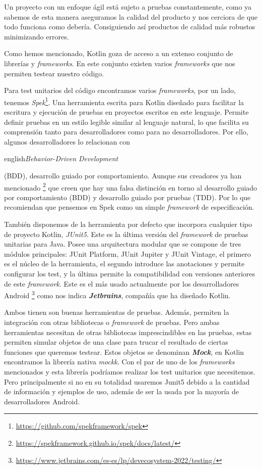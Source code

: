 Un proyecto con un enfoque ágil está sujeto a pruebas constantemente, como ya sabemos de esta manera aseguramos la calidad del producto y nos cerciora de que todo funciona como debería. Consiguiendo así productos de calidad más robustos minimizando errores.

Como hemos mencionado, Kotlin goza de acceso a un extenso conjunto de librerías y \textit{frameworks}. En este conjunto existen varios \textit{frameworks} que nos permiten testear nuestro código.

Para test unitarios del código encontramos varios \textit{frameworks}, por un lado, tenemos \textit{Spek}\footnote{\url{https://github.com/spekframework/spek}}. Una herramienta escrita para Kotlin diseñado para facilitar la escritura y ejecución de pruebas en proyectos escritos en este lenguaje. Permite definir pruebas en un estilo legible similar al lenguaje natural, lo que facilita su comprensión tanto para desarrolladores como para no desarrolladores. Por ello, algunos desarrolladores lo relacionan con \begin{otherlanguage}
{english}\textit{Behavior-Driven Development}\end{otherlanguage} (BDD), desarrollo guiado por comportamiento. Aunque sus creadores ya han mencionado \footnote{\url{https://spekframework.github.io/spek/docs/latest/}} que creen que hay una falsa distinción en torno al desarrollo guiado por comportamiento (BDD) y desarrollo guiado por pruebas (TDD). Por lo que recomiendan que pensemos en Spek como un simple \textit{framework} de especificación.

También disponemos de la herramienta por defecto que incorpora cualquier tipo de proyecto Kotlin, \textit{JUnit5}. Este es la última versión del \textit{framework} de pruebas unitarias para Java. Posee una arquitectura modular que se compone de tres módulos principales: JUnit Platform, JUnit Jupiter y JUnit Vintage, el primero es el núcleo de la herramienta, el segundo introduce las anotaciones y permite configurar los test, y la última permite la compatibilidad con versiones anteriores de este \textit{framework}. Este es el más usado actualmente por los desarrolladores Android \footnote{\url{https://www.jetbrains.com/es-es/lp/devecosystem-2022/testing/}} como nos indica \textbf{\textit{Jetbrains}}, compañía que ha diseñado Kotlin.

Ambos tienen son buenas herramientas de pruebas. Además, permiten la integración con otras bibliotecas o \textit{framework} de pruebas. Pero ambas herramientas necesitan de otras bibliotecas imprescindibles en las pruebas, estas permiten simular objetos de una clase para trucar el resultado de ciertas funciones que queremos testear. Estos objetos se denominan \textbf{\textit{Mock}}, en Kotlin encontramos la librería nativa \textit{mockk}. Con el par de uno de los \textit{frameworks} mencionados y esta librería podríamos realizar los test unitarios que necesitemos. Pero principalmente si no en su totalidad usaremos Junit5 debido a la cantidad de información y ejemplos de uso, además de ser la usada por la mayoría de desarrolladores Android.

